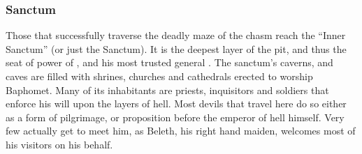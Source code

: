 \subsubsection{Sanctum}
\label{sec:Sanctum}

Those that successfully traverse the deadly maze of the chasm reach the
``Inner Sanctum'' (or just the Sanctum). It is the deepest layer of the pit,
and thus the seat of power of , and his most trusted
general . The sanctum's caverns, and caves are filled with
shrines, churches and cathedrals erected to worship Baphomet. Many of its
inhabitants are priests, inquisitors and soldiers that enforce his will upon
the layers of hell. Most devils that travel here do so either as a form of
pilgrimage, or proposition before the emperor of hell himself. Very few
actually get to meet him, as Beleth, his right hand maiden, welcomes most of
his visitors on his behalf.
